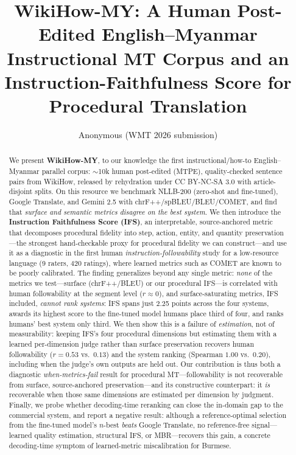 \documentclass[11pt]{article}
\title{WikiHow-MY: A Human Post-Edited English--Myanmar Instructional MT Corpus
and an Instruction-Faithfulness Score for Procedural Translation}
\author{Anonymous (WMT 2026 submission)}
\date{}
\begin{document}
\maketitle

\begin{abstract}
We present \textbf{WikiHow-MY}, to our knowledge the first instructional/how-to
English--Myanmar parallel corpus: $\sim$10k human post-edited (MTPE), quality-checked
sentence pairs from WikiHow, released by rehydration under CC BY-NC-SA 3.0 with
article-disjoint splits. On this resource we benchmark NLLB-200 (zero-shot and
fine-tuned), Google Translate, and Gemini 2.5 with chrF++/spBLEU/BLEU/COMET, and find
that \emph{surface and semantic metrics disagree on the best system}. We then introduce
the \textbf{Instruction Faithfulness Score (IFS)}, an interpretable, source-anchored
metric that decomposes procedural fidelity into step, action, entity, and quantity
preservation---the strongest hand-checkable proxy for procedural fidelity we can
construct---and use it as a diagnostic in the first human \emph{instruction-followability}
study for a low-resource language (9 raters, 420 ratings), where learned metrics such as
COMET are known to be poorly calibrated. The finding generalizes beyond any single metric:
\emph{none} of the metrics we test---surface (chrF++/BLEU) or our procedural IFS---is correlated
with human followability at the segment level ($r{\approx}0$), and surface-saturating metrics,
IFS included, \emph{cannot rank systems}: IFS spans just 2.25 points across the four systems,
awards its highest score to the fine-tuned model humans place third of four, and ranks humans'
best system only third. We then show this is a failure of \emph{estimation}, not of measurability:
keeping IFS's four procedural dimensions but estimating them with a learned per-dimension judge
rather than surface preservation recovers human followability ($r{=}0.53$ vs.\ $0.13$) and the
system ranking (Spearman $1.00$ vs.\ $0.20$), including when the judge's own outputs are held
out. Our contribution is thus both a diagnostic \emph{when-metrics-fail} result for procedural
MT---followability is not recoverable from surface, source-anchored preservation---and its
constructive counterpart: it \emph{is} recoverable when those same dimensions are estimated per
dimension by judgment.
Finally, we probe whether decoding-time reranking can close the in-domain gap to the
commercial system, and report a negative result: although a reference-optimal selection
from the fine-tuned model's $n$-best \emph{beats} Google Translate, no reference-free
signal---learned quality estimation, structural IFS, or MBR---recovers this gain, a
concrete decoding-time symptom of learned-metric miscalibration for Burmese.
\end{abstract}
\end{document}
